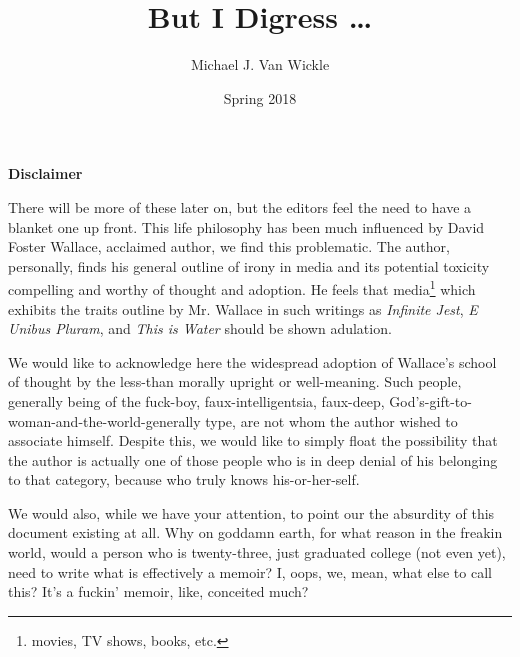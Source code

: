

\pagecolor{WhiteSmoke}

\title{But I Digress \ldots}
\author{Michael J. Van Wickle}
\date{Spring 2018}


\frontmatter
\pagestyle{empty}

\begin{titlepage}
\customtitlepage
\end{titlepage}

\posttitlepage
\newpage

\renewcommand{\thefootnote}{\fnsymbol{footnote}}
\pagestyle{fancy}
\fancyhf{}
\renewcommand{\chaptermark}[1]{\markboth{#1}{}}
\renewcommand{\sectionmark}[1]{\markright{#1}}
\fancyhead[ER]{\nouppercase{\rightmark}}
\fancyhead[OL]{\nouppercase{\leftmark}}
\fancyfoot[EL,OR]{\thepage}

\setlength{\parskip}{\baselineskip}
\newcommand{\editorsnote}{Disclaimer}
{\centering\bfseries\Large \editorsnote}
\markright{\editorsnote}\addcontentsline{toc}{chapter}{\editorsnote}

\vspace*{\fill}
{\normalsize There will be more of these later on, but the editors feel the need to have a blanket one up front.
This life philosophy has been much influenced by David Foster Wallace, acclaimed author, we find this problematic.
The author, personally, finds his general outline of irony in media and its potential toxicity compelling and worthy of thought and adoption.
He feels that media\footnote{movies, TV shows, books, etc.} which exhibits the traits outline by Mr. Wallace in such writings as \textit{Infinite Jest}, \textit{E Unibus Pluram}, and \textit{This is Water} should be shown adulation.

We would like to acknowledge here the widespread adoption of Wallace's school of thought by the less-than morally upright or well-meaning.
Such people, generally being of the fuck-boy, faux-intelligentsia, faux-deep, God's-gift-to-woman-and-the-world-generally type, are not whom the author wished to associate himself.
Despite this, we would like to simply float the possibility that the author is actually one of those people who is in deep denial of his belonging to that category, because who truly knows his-or-her-self.

We would also, while we have your attention, to point our the absurdity of this document existing at all.
Why on goddamn earth, for what reason in the freakin world, would a person who is twenty-three, just graduated college (not even yet), need to write what is effectively a memoir?
I, oops, we, mean, what else to call this?
It's a fuckin' memoir, like, conceited much?}

